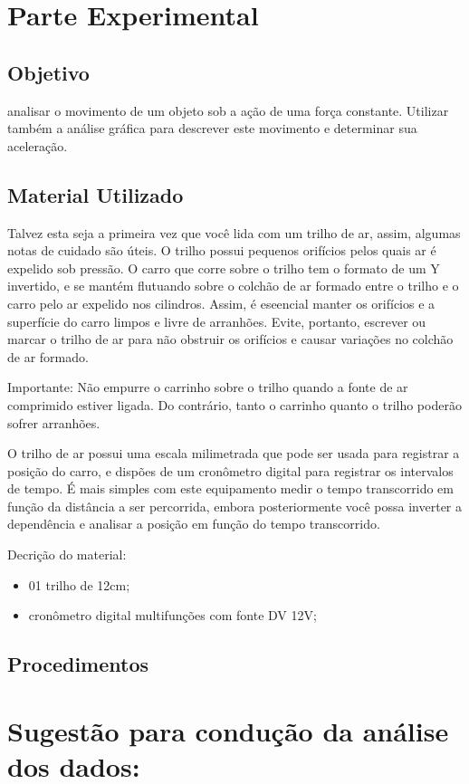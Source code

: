 \section{Parte Experimental}

\subsection{Objetivo}
analisar o movimento de um objeto sob a ação de uma força constante. Utilizar também a análise gráfica para descrever este movimento e determinar sua aceleração.

\subsection{Material Utilizado}

Talvez esta seja a primeira vez que você lida com um trilho de ar, assim, algumas notas de cuidado são úteis. O trilho possui pequenos orifícios pelos quais ar é expelido sob pressão. O carro que corre sobre o trilho tem o formato de um Y invertido, e se mantém flutuando sobre o colchão de ar formado entre o trilho e o carro pelo ar expelido nos cilindros. Assim, é eseencial manter os orifícios e a superfície do carro limpos e livre de arranhões. Evite, portanto, escrever ou marcar o trilho de ar para não obstruir os orifícios e causar variações no colchão de ar formado.

Importante: Não empurre o carrinho sobre o trilho quando a fonte de ar comprimido estiver ligada. Do contrário, tanto o carrinho quanto o trilho poderão sofrer arranhões.

O trilho de ar possui uma escala milimetrada que pode ser usada para registrar a posição do carro, e dispões de um cronômetro digital para registrar os intervalos de tempo. É mais simples com este equipamento medir o tempo transcorrido em função da distância a ser percorrida, embora posteriormente você possa inverter a dependência e analisar a posição em função do tempo transcorrido.

Decrição do material:

\begin{itemize}
\item 01 trilho de 12cm;
\item cronômetro digital multifunções com fonte DV 12V;
\end{itemize}


\subsection{Procedimentos}

\section{Sugestão para condução da análise dos dados:}


